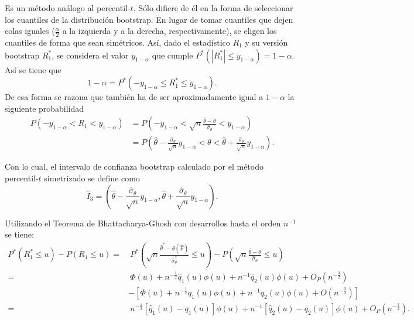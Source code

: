 \documentclass[]{book}
\theoremstyle{break}
\theoremstyle{definition}
\theoremstyle{definition}
\theoremstyle{definition}
\theoremstyle{remark}
\begin{document}
Es un método análogo al percentil-\(t\). Sólo difiere de él en la forma
de seleccionar los cuantiles de la distribución bootstrap. En lugar de
tomar cuantiles que dejen colas iguales (\(\frac{\alpha }{2}\) a la
izquierda y a la derecha, respectivamente), se eligen los cuantiles de
forma que sean simétricos. Así, dado el estadístico \(R_1\) y su versión
bootstrap \(R_1^{\ast}\), se considera el valor \(y_{1-\alpha }\) que
cumple
\(P^{\ast}\left( \left\vert R_1^{\ast}\right\vert \leq y_{1-\alpha } \right) =1-\alpha\).
Así se tiene que
\[1-\alpha =P^{\ast}\left( -y_{1-\alpha }\leq R_1^{\ast}
\leq y_{1-\alpha} \right).\] De esa forma se razona que también ha de
ser aproximadamente igual a \(1-\alpha\) la siguiente probabilidad
\[\begin{aligned}
P\left( -y_{1-\alpha }<R_1<y_{1-\alpha } \right) &= P\left( -y_{1-\alpha }
< \sqrt{n}\frac{\hat{\theta}-\theta }{\hat{\sigma}_{\theta }}
< y_{1-\alpha} \right) \\
&= P\left( \hat{\theta}-\frac{\hat{\sigma}_{\theta }}{\sqrt{n}}y_{1-\alpha
}<\theta <\hat{\theta}+\frac{\hat{\sigma}_{\theta }}{\sqrt{n}}y_{1-\alpha
} \right).
\end{aligned}\]

Con lo cual, el intervalo de confianza bootstrap calculado por el método
percentil-\(t\) simetrizado se define como
\[\hat{I}_3=\left( \hat{\theta}-\frac{\hat{\sigma}_{\theta }}{\sqrt{n}}
y_{1-\alpha },\hat{\theta}+\frac{\hat{\sigma}_{\theta }}{\sqrt{n}}
y_{1-\alpha } \right).\]

Utilizando el Teorema de Bhattacharya-Ghosh con desarrollos hasta el
orden \(n^{-1}\) se tiene: \[\begin{aligned}
P^{\ast}\left( R_1^{\ast}\leq u \right) -P\left( R_1\leq u \right) 
=&\ P^{\ast}\left( \sqrt{n}\frac{\hat{\theta}^{\ast}-\theta \left( \hat{F}
 \right)}{\hat{\sigma}_{\theta }^{\ast}}\leq u \right) -P\left( \sqrt{n}
\frac{\hat{\theta}-\theta }{\hat{\sigma}_{\theta }}\leq u \right) \\
=&\ \Phi \left( u \right) +n^{-\frac{1}{2}}\hat{q}_1\left( u \right) \phi
\left( u \right) +n^{-1}\hat{q}_2\left( u \right) \phi \left( u \right)
+O_{P}\left( n^{-\frac{3}{2}} \right) \\
& -\left[ \Phi \left( u \right) +n^{-\frac{1}{2}}q_1\left( u \right) \phi
\left( u \right) +n^{-1}q_2\left( u \right) \phi \left( u \right) +O\left(
n^{-\frac{3}{2}} \right) \right] \\
=&\ n^{-\frac{1}{2}}\left[ \hat{q}_1\left( u \right) -q_1\left( u \right) 
\right] \phi \left( u \right) 
+n^{-1}\left[ \hat{q}_2\left( u \right) -q_2\left( u \right) \right] \phi
\left( u \right) +O_{P}\left( n^{-\frac{3}{2}} \right).
\end{aligned}\]
\end{document}
